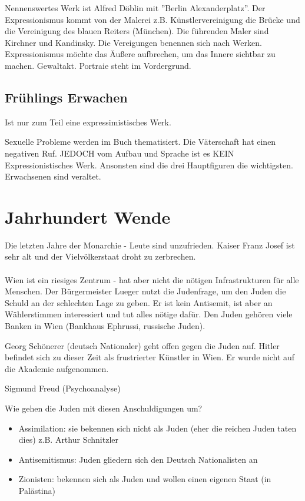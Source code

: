 \documentclass[12pt,a4paper]{article}
\begin{document}
Nennenswertes Werk ist Alfred Döblin mit ''Berlin Alexanderplatz''.
Der Expressionismus kommt von der Malerei z.B. Künstlervereinigung die Brücke und die Vereinigung des blauen Reiters (München). Die führenden Maler sind Kirchner und Kandinsky. Die Vereigungen benennen sich nach Werken. Expressionismus möchte das Äußere aufbrechen, um das Innere sichtbar zu machen. Gewaltakt. Portraie steht im Vordergrund.

\subsection{Frühlings Erwachen}

Ist nur zum Teil eine expressimistisches Werk.

Sexuelle Probleme werden im Buch thematisiert.
Die Väterschaft hat einen negativen Ruf.
JEDOCH vom Aufbau und Sprache ist es KEIN Expressionistisches Werk.
Ansonsten sind die drei Hauptfiguren die wichtigsten. Erwachsenen sind veraltet.

\section{Jahrhundert Wende}

Die letzten Jahre der Monarchie - Leute sind unzufrieden. Kaiser Franz Josef ist sehr alt und der Vielvölkerstaat droht zu zerbrechen. 
\\\\
Wien ist ein riesiges Zentrum - hat aber nicht die nötigen Infrastrukturen für alle Menschen. Der Bürgermeister Lueger nutzt die Judenfrage, um den Juden die Schuld an der schlechten Lage zu geben. Er ist kein Antisemit, ist aber an Wählerstimmen interessiert und tut alles nötige dafür. Den Juden gehören viele Banken in Wien (Bankhaus Ephrussi, russische Juden).

Georg Schönerer (deutsch Nationaler) geht offen gegen die Juden auf. Hitler befindet sich zu dieser Zeit als frustrierter Künstler in Wien. Er wurde nicht auf die Akademie aufgenommen.

Sigmund Freud (Psychoanalyse)

Wie gehen die Juden mit diesen Anschuldigungen um?

\begin{itemize}
\item Assimilation: sie bekennen sich nicht als Juden (eher die reichen Juden taten dies) z.B. Arthur Schnitzler
\item Antisemitismus: Juden gliedern sich den Deutsch Nationalisten an
\item Zionisten: bekennen sich als Juden und wollen einen eigenen Staat (in Palästina)
\end{itemize}
\end{document}
